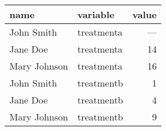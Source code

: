 \begin{tabular}{llr}
  \toprule
 name & variable & value \\ 
  \midrule
  John Smith & treatmenta & --- \\ 
  Jane Doe & treatmenta &  14 \\ 
  Mary Johnson & treatmenta &  16 \\ 
  John Smith & treatmentb &   1 \\ 
  Jane Doe & treatmentb &   4 \\ 
  Mary Johnson & treatmentb &   9 \\ 
   \bottomrule
\end{tabular}

